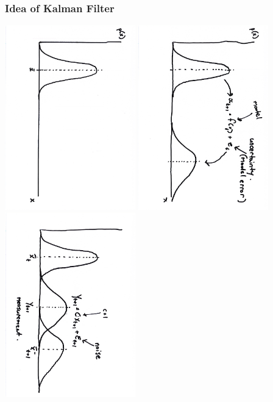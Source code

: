 \documentclass[compress]{beamer}
\begin{document}
\begin{frame}\frametitle{Idea of Kalman Filter}
\begin{center}
	\includegraphics[height=8cm,angle=90]{./Figures/KalmanSketch1.pdf}
	\includegraphics[height=8cm,angle=90]{./Figures/KalmanSketch2.pdf}
	\includegraphics[height=8cm,angle=90]{./Figures/KalmanSketch3.pdf}

\end{center}
\end{frame}
\end{document}
